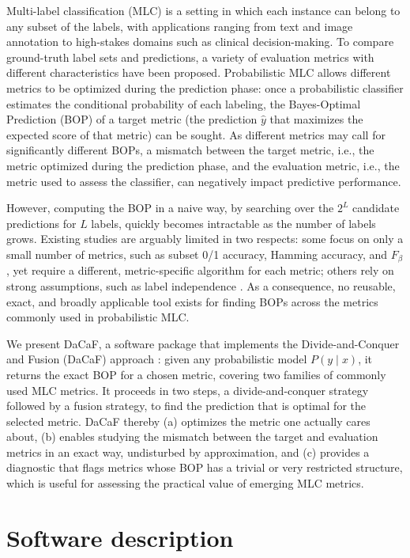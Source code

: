 \documentclass[11pt, letterpaper]{article}
\begin{document}
Multi-label classification (MLC) is a setting in which each instance can belong to
any subset of the labels, with applications ranging from text and image annotation to
high-stakes domains such as clinical decision-making. To compare ground-truth label sets
and predictions, a variety of evaluation metrics with different characteristics have been
proposed. Probabilistic MLC allows different metrics to be optimized during the prediction
phase: once a probabilistic classifier estimates
the conditional probability of each labeling, the Bayes-Optimal Prediction (BOP) of a
target metric (the prediction $\hat{y}$ that maximizes the expected score of that
metric) can be sought. As different metrics may call for significantly different BOPs, a
mismatch between the target metric, i.e., the metric optimized during the prediction
phase, and the evaluation metric, i.e., the metric used to assess the classifier, can
negatively impact predictive performance.

However, computing the BOP in a naive way, by searching over the $2^L$ candidate
predictions for $L$ labels, quickly becomes intractable as the number of labels grows.
Existing studies are arguably limited in two respects: some focus on only a small number
of metrics, such as subset 0/1 accuracy, Hamming accuracy, and $F_\beta$
\citep{pcc2010,fmax2011,waegeman2014}, yet require a different, metric-specific algorithm
for each metric; others rely on strong assumptions, such as label independence
\citep{pillai2017}. As a consequence, no reusable, exact, and broadly applicable tool
exists for finding BOPs across the metrics commonly used in probabilistic MLC.

We present DaCaF, a software package that implements the Divide-and-Conquer and Fusion
(DaCaF) approach \citep{dacaf2026}: given any probabilistic model $P(y\mid x)$, it returns
the exact BOP for a chosen metric, covering two families of commonly used MLC metrics. It
proceeds in two steps, a divide-and-conquer strategy followed by a fusion strategy, to
find the prediction that is optimal for the selected metric. DaCaF thereby (a) optimizes
the metric one actually cares about, (b) enables studying the mismatch between the target
and evaluation metrics in an exact way, undisturbed by approximation, and (c) provides a
diagnostic that flags metrics whose BOP has a trivial or very restricted
structure, which is useful for assessing the practical value of emerging MLC metrics.

\section{Software description}\label{sec:description}
\end{document}
